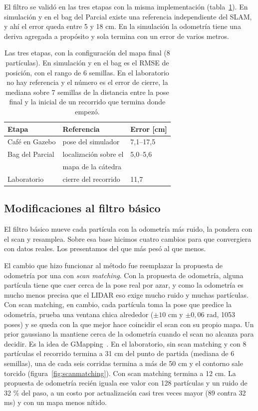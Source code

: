 El filtro se validó en las tres etapas con la misma implementación
(tabla~\ref{tab:etapas}). En simulación y en el bag del Parcial existe una
referencia independiente del SLAM, y ahí el error queda entre 5 y 18 cm. En
la simulación la odometría tiene una deriva agregada a propósito y sola
termina con un error de varios metros.

\begin{table}[t]
  \centering\small
  \caption{Las tres etapas, con la configuración del mapa final (8
    partículas). En simulación y en el bag es el RMSE de posición, con el
    rango de 6 semillas. En el laboratorio no hay referencia y el número es el
    error de cierre, la mediana sobre 7 semillas de la distancia entre la pose
    final y la inicial de un recorrido que termina donde empezó.}
  \label{tab:etapas}
  \begin{tabular}{@{}lll@{}}
    \toprule
    Etapa & Referencia & Error [cm] \\
    \midrule
    Café en Gazebo & pose del simulador & 7,1--17,5 \\
    Bag del Parcial & localización sobre el & 5,0--5,6 \\
                    & mapa de la cátedra & \\
    Laboratorio & cierre del recorrido & 11,7 \\
    \bottomrule
  \end{tabular}
\end{table}

\subsection{Modificaciones al filtro básico}

El filtro básico mueve cada partícula con la odometría más ruido, la pondera
con el scan y resamplea. Sobre esa base hicimos cuatro cambios para que
convergiera con datos reales. Los presentamos del que más pesó al que menos.

El cambio que hizo funcionar al método fue reemplazar la propuesta de odometría
por una con \emph{scan matching}. Con la propuesta de odometría, alguna
partícula tiene que caer cerca de la pose real por azar, y como la odometría es
mucho menos precisa que el LIDAR eso exige mucho ruido y muchas partículas. Con
scan matching, en cambio, cada partícula toma la pose que predice la odometría,
prueba una ventana chica alrededor ($\pm 10$ cm y $\pm 0{,}06$ rad, 1053 poses)
y se queda con la que mejor hace coincidir el scan con su propio mapa. Un prior
gaussiano la mantiene cerca de la odometría cuando el scan no alcanza para
decidir. Es la idea de GMapping~\cite{gmapping}. En el laboratorio, sin scan
matching y con 8 partículas el recorrido termina a 31 cm del punto de partida
(mediana de 6 semillas), una de cada seis corridas termina a más de 50 cm y el
contorno sale torcido (figura~\ref{fig:scanmatching}). Con scan matching
termina a 12 cm. La propuesta de odometría recién iguala ese valor con 128
partículas y un ruido de 32 \% del paso, a un costo por actualización casi tres
veces mayor (89 contra 32 ms) y con un mapa menos nítido.

